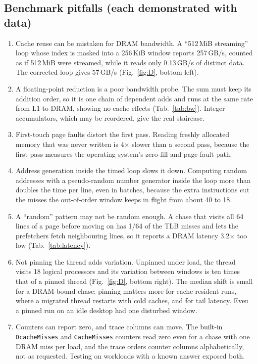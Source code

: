 \documentclass{article}
\begin{document}
\subsection{Benchmark pitfalls (each demonstrated with data)}\label{sec:pitfalls}
\begin{enumerate}
  \item Cache reuse can be mistaken for DRAM bandwidth. A ``512\,MiB streaming'' loop whose index is masked into a 256\,KiB window reports 257\,GB/s, counted as if 512\,MiB were streamed, while it reads only 0.13\,GB/s of distinct data. The corrected loop gives 57\,GB/s (Fig.~\ref{fig:D}, bottom left).
  \item A floating-point reduction is a poor bandwidth probe. The sum must keep its addition order, so it is one chain of dependent adds and runs at the same rate from L1 to DRAM, showing no cache effects (Tab.~\ref{tab:bw}). Integer accumulators, which may be reordered, give the real staircase.
  \item First-touch page faults distort the first pass. Reading freshly allocated memory that was never written is 4$\times$ slower than a second pass, because the first pass measures the operating system's zero-fill and page-fault path.
  \item Address generation inside the timed loop slows it down. Computing random addresses with a pseudo-random number generator inside the loop more than doubles the time per line, even in batches, because the extra instructions cut the misses the out-of-order window keeps in flight from about 40 to 18.
  \item A ``random'' pattern may not be random enough. A chase that visits all 64 lines of a page before moving on has 1/64 of the TLB misses and lets the prefetchers fetch neighbouring lines, so it reports a DRAM latency 3.2$\times$ too low (Tab.~\ref{tab:latency}).
  \item Not pinning the thread adds variation. Unpinned under load, the thread visits 18 logical processors and its variation between windows is ten times that of a pinned thread (Fig.~\ref{fig:D}, bottom right). The median shift is small for a DRAM-bound chase; pinning matters more for cache-resident runs, where a migrated thread restarts with cold caches, and for tail latency. Even a pinned run on an idle desktop had one disturbed window.
  \item Counters can report zero, and trace columns can move. The built-in \texttt{DcacheMisses} and \texttt{CacheMisses} counters read zero even for a chase with one DRAM miss per load, and the trace orders counter columns alphabetically, not as requested. Testing on workloads with a known answer exposed both.

\end{enumerate}
\end{document}
